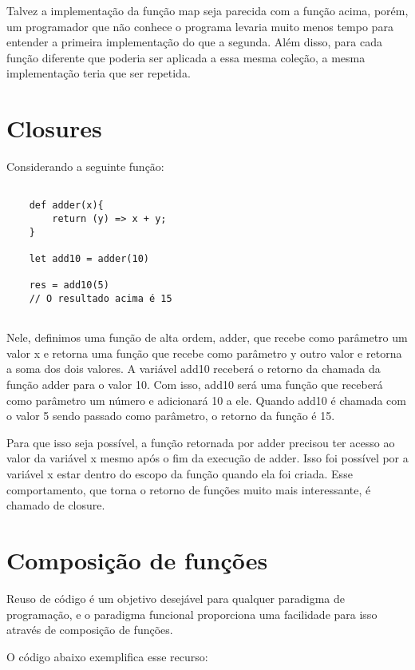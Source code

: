 Talvez a implementação da função map seja parecida 
com a função acima, porém, um programador que não 
conhece o programa levaria muito menos tempo para 
entender a primeira implementação do que a segunda. 
Além disso, para cada função diferente que poderia 
ser aplicada a essa mesma coleção, a mesma 
implementação teria que ser repetida.


\section{Closures}

Considerando a seguinte função:

\begin{lstlisting}[caption={Exemplo de Closure},label=closureex]

    def adder(x){
        return (y) => x + y;
    }

    let add10 = adder(10)

    res = add10(5)
    // O resultado acima é 15


\end{lstlisting}

Nele, definimos uma função de alta ordem, adder, que 
recebe como parâmetro um valor x e retorna uma função 
que recebe como parâmetro y outro valor e retorna a 
soma dos dois valores. A variável add10 receberá 
o retorno da chamada da função adder para o valor 10. 
Com isso, add10 será uma função que receberá como 
parâmetro um número e adicionará 10 a ele. Quando 
add10 é chamada com o valor 5 sendo passado como 
parâmetro, o retorno da função é 15.

Para que isso seja possível, a função retornada por 
adder precisou ter acesso ao valor da variável x mesmo 
após o fim da execução de adder. Isso foi possível 
por a variável x estar dentro do escopo da função 
quando ela foi criada. Esse comportamento, que torna 
o retorno de funções muito mais interessante, é chamado 
de closure.


\section{Composição de funções}

Reuso de código é um objetivo desejável para qualquer 
paradigma de programação, e o paradigma funcional 
proporciona uma facilidade para isso através de 
composição de funções.

O código abaixo exemplifica esse recurso:

